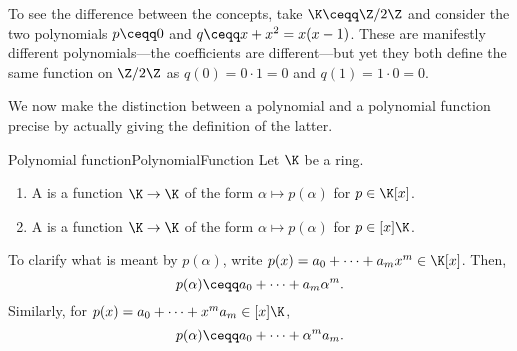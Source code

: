To see the difference between the concepts, take $\K \ceqq \Z /2\Z$ and consider the two polynomials $p\ceqq 0$ and $q\ceqq x+x^2=x(x-1)$.  These are manifestly different polynomials---the coefficients are different---but yet they both define the same function on $\Z /2\Z$ as $q(0)=0\cdot 1=0$ and $q(1)=1\cdot 0=0$.

We now make the distinction between a polynomial and a polynomial function precise by actually giving the definition of the latter.
\begin{dfn}{Polynomial function}{PolynomialFunction}
	Let $\K$ be a ring.
	\begin{enumerate}
		\item A  is a function $\K \rightarrow \K$ of the form $\alpha \mapsto p(\alpha )$ for $p\in \K [x]$.
		\item A  is a function $\K \rightarrow \K$ of the form $\alpha \mapsto p(\alpha )$ for $p\in [x]\K$.
	\end{enumerate}
	\begin{rmk}
		To clarify what is meant by $p(\alpha )$, write $p(x)=a_0+\cdots +a_mx^m\in \K [x]$.  Then,
		\begin{equation}
			p(\alpha )\ceqq a_0+\cdots +a_m\alpha ^m.
		\end{equation}
		Similarly, for $p(x)=a_0+\cdots +x^ma_m\in [x]\K$,
		\begin{equation}
			p(\alpha )\ceqq a_0+\cdots +\alpha ^ma_m.
		\end{equation}
	\end{rmk}
\end{dfn}

\horizontalrule

